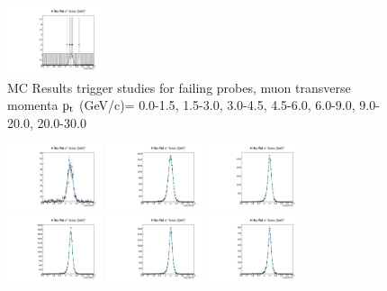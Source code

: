 \documentclass{article}
\begin{document}
\begin{figure}
    \includegraphics[width=0.25\textwidth]{../PlotsRooFitMC/croofit_trg_fail_6.pdf}
    \caption{MC Results trigger studies for failing probes, muon transverse momenta
    $\rm p_{t}$ (GeV/c)= {0.0-1.5}, {1.5-3.0}, {3.0-4.5}, {4.5-6.0}, 
    {6.0-9.0}, {9.0-20.0}, {20.0-30.0}}
\end{figure}


\begin{figure}
    \includegraphics[width=0.25\textwidth]{../PlotsRooFitMC/croofit_trk_pass_0.pdf}
    \includegraphics[width=0.25\textwidth]{../PlotsRooFitMC/croofit_trk_pass_1.pdf}
    \includegraphics[width=0.25\textwidth]{../PlotsRooFitMC/croofit_trk_pass_2.pdf}
    \includegraphics[width=0.25\textwidth]{../PlotsRooFitMC/croofit_trk_pass_3.pdf}
    \includegraphics[width=0.25\textwidth]{../PlotsRooFitMC/croofit_trk_pass_4.pdf}
    \includegraphics[width=0.25\textwidth]{../PlotsRooFitMC/croofit_trk_pass_5.pdf}

\end{figure}
\end{document}
